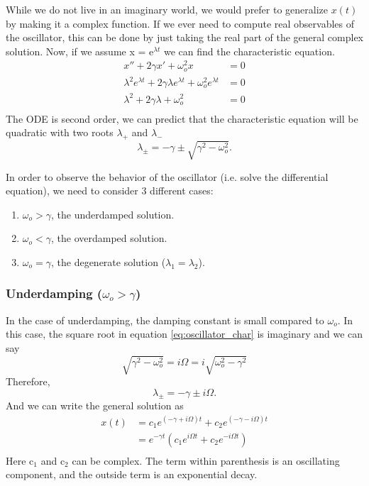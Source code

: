 \documentclass{article}
\newcommand{\be}{\begin{equation}}
\newcommand{\ee}{\end{equation}}
\newcommand{\benum}{\begin{enumerate}}
\newcommand{\eenum}{\end{enumerate}}
\begin{document}
While we do not live in an imaginary world, we would prefer to generalize $x(t)$ by making it a complex function.
If we ever need to compute real observables of the oscillator, this can be done by just taking the real part of the general complex solution.
Now, if we assume x = e$^{\lambda t}$ we can find the characteristic equation.
\be
\begin{split}
    x'' + 2\gamma x' + \omega_o^2 x &= 0\\
    \lambda^2 e^{\lambda t} + 2\gamma\lambda e^{\lambda t} + \omega_o^2 e^{\lambda t} &= 0\\
    \lambda^2 + 2\gamma\lambda  + \omega_o^2 &= 0\\
\end{split}
\ee
The ODE is second order, we can predict that the characteristic equation will be quadratic with two roots $\lambda_+$ and $\lambda_-$
\be \label{eq:oscillator_char}
\lambda_{\pm} = -\gamma \pm \sqrt{\gamma^2 - \omega_o^2} .
\ee

In order to observe the behavior of the oscillator (i.e. solve the differential equation), we need to consider 3 different cases:
\benum
\item $\omega_o > \gamma$, the underdamped solution.
\item $\omega_o < \gamma$, the overdamped solution.
\item $\omega_o = \gamma$, the degenerate solution ($\lambda_1 = \lambda_2$).
\eenum

\subsubsection*{Underdamping ($\omega_o > \gamma$)}
In the case of underdamping, the damping constant is small compared to $\omega_o$. In this case, the square root in equation \ref{eq:oscillator_char} is imaginary and we can say
\be
\sqrt{\gamma^2 - \omega_o^2} = i \Omega = i \sqrt{\omega_o^2 - \gamma^2}
\ee
Therefore,
\be
\lambda_{\pm} = -\gamma \pm i \Omega .
\ee
And we can write the general solution as
\be
\begin{split}
x(t) &= c_1 e^{(-\gamma + i \Omega)t} + c_2 e^{(-\gamma - i \Omega)t} \\
&= e^{-\gamma t}(c_1 e^{i \Omega t} + c_2 e^{-i \Omega t}) \\
\end{split}
\ee
Here c$_1$ and c$_2$ can be complex.
The term within parenthesis is an oscillating component, and the outside term is an exponential decay.
\end{document}
